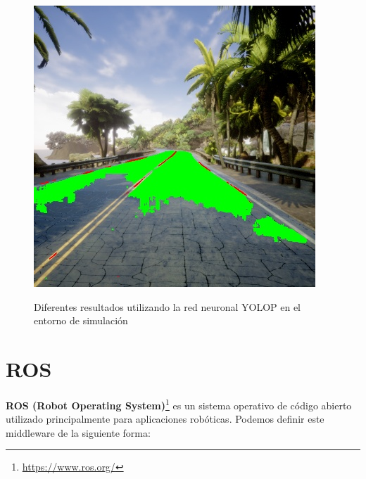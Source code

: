 \begin{figure}[H]
\begin{center}
{      \includegraphics[scale=0.4]{figs/Plataformas_Desarollo/resultados-yolop/sitio1/ONNX-1280-1280.jpg}
      \label{f:yolop-1280-1280.onnx}}
  \caption{Diferentes resultados utilizando la red neuronal YOLOP en el entorno de simulación}
  \label{f:resultadosYOLOP}
  \end{center}
 \end{figure}
 \newpage
\section{ROS}
\label{sec:ros}
\textbf{ROS (Robot Operating System)}\footnote{\url{https://www.ros.org/}} es un sistema operativo de código abierto utilizado principalmente para aplicaciones robóticas. 
Podemos definir este middleware de la siguiente forma:

